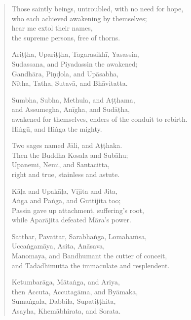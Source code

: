 \documentclass[12pt,openany]{book}%
\begin{document}
\begin{verse}%
Those saintly beings, untroubled, with no need for hope, \\
who each achieved awakening by themselves; \\
hear me extol their names, \\
the supreme persons, free of thorns. 

\textsanskrit{Ariṭṭha}, \textsanskrit{Upariṭṭha}, \textsanskrit{Tagarasikhī}, Yasassin, \\
Sudassana, and Piyadassin the awakened; \\
\textsanskrit{Gandhāra}, \textsanskrit{Piṇḍola}, and \textsanskrit{Upāsabha}, \\
\textsanskrit{Nītha}, Tatha, \textsanskrit{Sutavā}, and \textsanskrit{Bhāvitatta}. 

Sumbha, Subha, Methula, and \textsanskrit{Aṭṭhama}, \\
and Assumegha, \textsanskrit{Anīgha}, and \textsanskrit{Sudāṭha}, \\
awakened for themselves, enders of the conduit to rebirth. \\
\textsanskrit{Hiṅgū}, and \textsanskrit{Hiṅga} the mighty. 

Two sages named \textsanskrit{Jāli}, and \textsanskrit{Aṭṭhaka}. \\
Then the Buddha Kosala and \textsanskrit{Subāhu}; \\
Upanemi, Nemi, and Santacitta, \\
right and true, stainless and astute. 

\textsanskrit{Kāḷa} and \textsanskrit{Upakāḷa}, Vijita and Jita, \\
\textsanskrit{Aṅga} and \textsanskrit{Paṅga}, and Guttijita too; \\
Passin gave up attachment, suffering’s root, \\
while \textsanskrit{Aparājita} defeated \textsanskrit{Māra}’s power. 

Satthar, Pavattar, \textsanskrit{Sarabhaṅga}, \textsanskrit{Lomahaṁsa}, \\
\textsanskrit{Uccaṅgamāya}, Asita, \textsanskrit{Anāsava}, \\
Manomaya, and Bandhumant the cutter of conceit, \\
and \textsanskrit{Tadādhimutta} the immaculate and resplendent. 

\textsanskrit{Ketumbarāga}, \textsanskrit{Mātaṅga}, and Ariya, \\
then Accuta, \textsanskrit{Accutagāma}, and \textsanskrit{Byāmaka}, \\
\textsanskrit{Sumaṅgala}, Dabbila, \textsanskrit{Supatiṭṭhita}, \\
Asayha, \textsanskrit{Khemābhirata}, and Sorata. 


\end{verse}
\end{document}

